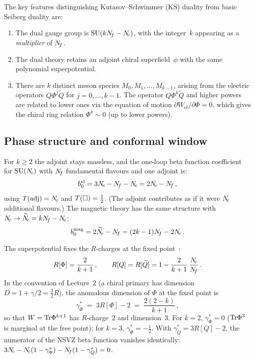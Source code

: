 \documentclass[11pt,a4paper]{article}
\newcommand{\Nctilde}{\widetilde{N}_{\!c}}
\begin{document}
The key features distinguishing Kutasov--Schwimmer (KS) duality from
basic Seiberg duality are:
\begin{enumerate}
  \item The dual gauge group is $\mathrm{SU}(kN_{\!f} - N_{\!c})$, with the
    integer~$k$ appearing as a \emph{multiplier} of $N_{\!f}$.
  \item The dual theory retains an adjoint chiral superfield~$\phi$
    with the same polynomial superpotential.
  \item There are $k$ distinct meson species $M_0, M_1, \ldots,
    M_{k-1}$, arising from the electric operators
    $Q\Phi^j\widetilde{Q}$ for $j = 0, \ldots, k-1$.
    The operator $Q\Phi^k\widetilde{Q}$ and higher powers are
    related to lower ones via the equation of motion
    $\partial W_{\text{el}}/\partial \Phi = 0$, which gives the
    chiral ring relation $\Phi^k \sim 0$ (up to lower powers).
\end{enumerate}

\subsection{Phase structure and conformal window}
\label{ssec:KS-window}

For $k \geq 2$ the adjoint stays massless, and the one-loop beta
function coefficient for $\mathrm{SU}(N_{\!c})$ with $N_{\!f}$ fundamental flavours and
one adjoint is:
\begin{equation}\label{eq:KS-beta}
  b_0^{\text{el}} = 3N_{\!c} - N_{\!f} - N_{\!c} = 2N_{\!c} - N_{\!f}\,,
\end{equation}
using $T(\mathrm{adj}) = N_{\!c}$ and $T(\square) = \tfrac{1}{2}$.  (The adjoint
contributes as if it were $N_{\!c}$ additional flavours.)  The magnetic
theory has the same structure with $\Nc \to \Nctilde = k\Nf - \Nc$:
\begin{equation}\label{eq:KS-beta-mag}
  b_0^{\text{mag}} = 2\Nctilde - \Nf = (2k - 1)\Nf - 2\Nc\,.
\end{equation}

The superpotential fixes the $R$-charges at the fixed
point~\cite{KS9505004}:
\begin{equation}\label{eq:KS-R}
  R[\Phi] = \frac{2}{k+1}\,,
  \qquad
  R[Q] = R[\widetilde{Q}] = 1 - \frac{2}{k+1}\,\frac{N_{\!c}}{N_{\!f}}\,.
\end{equation}
In the convention of Lecture~2 (a chiral primary has dimension
$D = 1 + \gamma/2 = \tfrac{3}{2}R$), the anomalous dimension of $\Phi$
at the fixed point is
\begin{equation}\label{eq:KS-gamma}
  \gamma_\Phi^* \;=\; 3R[\Phi] - 2 \;=\; \frac{2(2 - k)}{k + 1}\,,
\end{equation}
so that $W = \mathrm{Tr}\Phi^{k+1}$ has $R$-charge~$2$ and dimension~$3$.  For
$k = 2$, $\gamma_\Phi^* = 0$ ($\mathrm{Tr}\Phi^3$ is marginal at the free
point); for $k = 3$, $\gamma_\Phi^* = -\tfrac{1}{2}$.  With
$\gamma_Q^* = 3R[Q] - 2$, the numerator of the NSVZ beta function
vanishes identically:
$3N_{\!c} - N_{\!c}(1 - \gamma_\Phi^*) - N_{\!f}(1 - \gamma_Q^*) = 0$.
\end{document}
